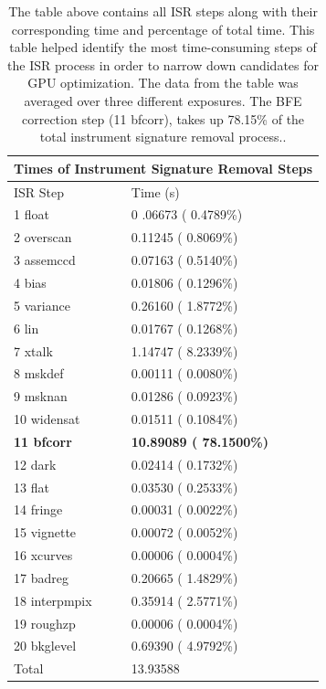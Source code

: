 \documentclass[DM,authoryear,toc]{lsstdoc}
\begin{document}
\begin{table}[h]
\begin{center}
\begin{tabular}{|p{100pt}|p{150pt}|}
\multicolumn{2}{c}{\textbf{Times of Instrument Signature Removal Steps}}\\
\hline
ISR Step & Time (s)\\
\hline
1  float & 0 .06673 ( 0.4789\%)\\
\hline
2 overscan & 0.11245 ( 0.8069\%)\\
\hline
3 assemccd & 0.07163 ( 0.5140\%)\\
\hline
4 bias & 0.01806 ( 0.1296\%)\\
\hline
5 variance & 0.26160 ( 1.8772\%)\\
\hline
6 lin & 0.01767 ( 0.1268\%)\\
\hline
7 xtalk & 1.14747 ( 8.2339\%)\\
\hline
8 mskdef & 0.00111 ( 0.0080\%)\\
\hline
9 msknan & 0.01286 ( 0.0923\%)\\
\hline
10 widensat & 0.01511 ( 0.1084\%)\\
\hline
\textbf{11 bfcorr} & \textbf{10.89089 ( 78.1500\%)}\\
\hline
12 dark & 0.02414 ( 0.1732\%)\\
\hline
13 flat & 0.03530 ( 0.2533\%)\\
\hline
14 fringe & 0.00031 ( 0.0022\%)\\
\hline
15 vignette & 0.00072 ( 0.0052\%)\\
\hline
16 xcurves & 0.00006 ( 0.0004\%)\\
\hline
17 badreg & 0.20665 ( 1.4829\%)\\
\hline
18 interpmpix & 0.35914 ( 2.5771\%)\\
\hline
19 roughzp & 0.00006 ( 0.0004\%)\\
\hline
20 bkglevel & 0.69390 ( 4.9792\%)\\
\hline
Total & 13.93588\\
\hline
\end{tabular}
\caption{\label{tab:isrtimes}The table above contains all ISR steps along with their corresponding 
time and percentage of total time. This table helped identify the most time-consuming 
steps of the ISR process in order to narrow down candidates for GPU optimization. 
The data from the table was averaged over three different exposures. The BFE correction 
step (11 bfcorr), takes up 78.15\% of the total instrument signature removal process..}
\end{center}
\end{table}
\end{document}
